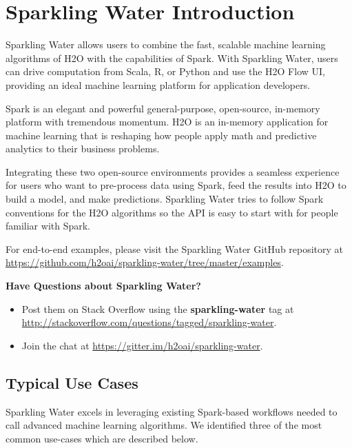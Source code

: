 \documentclass{standalone}
\begin{document}
    \section{Sparkling Water Introduction}

    Sparkling Water allows users to combine the fast, scalable machine learning algorithms of H2O with the capabilities
    of Spark. With Sparkling Water, users can drive computation from Scala, R, or Python and use the H2O Flow UI, providing
    an ideal machine learning platform for application developers.

    Spark is an elegant and powerful general-purpose, open-source, in-memory platform with tremendous momentum. H2O
    is an in-memory application for machine learning that is reshaping how people apply math and predictive analytics to
    their business problems.

    Integrating these two open-source environments provides a seamless experience for users who want to pre-process data
    using Spark, feed the results into H2O to build a model, and make predictions. Sparkling Water tries to follow Spark
    conventions for the H2O algorithms so the API is easy to start with for people familiar with Spark.

    For end-to-end examples, please visit the Sparkling Water GitHub repository at {\url{https://github.com/h2oai/sparkling-water/tree/master/examples}}.

    \begin{minipage}{\textwidth}
        \textbf{Have Questions about Sparkling Water?}
        \setlength{\parskip}{1em}
        \begin{itemize}
            \setlength\itemsep{1pt}
            \item Post them on Stack Overflow using the \textbf{sparkling-water} tag at {\url{http://stackoverflow.com/questions/tagged/sparkling-water}}.
            \item Join the chat at {\url{https://gitter.im/h2oai/sparkling-water}}.
        \end{itemize}
    \end{minipage}

    \subsection{Typical Use Cases}
    Sparkling Water excels in leveraging existing Spark-based workflows needed to call advanced machine learning
    algorithms. We identified three of the most common use-cases which are described below.
\end{document}
